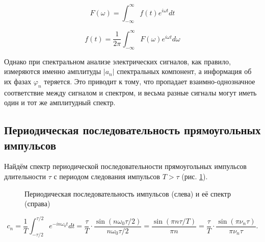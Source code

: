\documentclass[a4paper, 12pt]{article}
\begin{document}
    \begin{equation}
        F(\omega) = \int_{-\infty}^{\infty} f(t) e^{i \omega t} dt
        \label{eq:dir_fourier}
    \end{equation}

    \begin{equation}
        f(t) = \frac{1}{2\pi} \int_{-\infty}^{\infty} F(\omega) e^{i \omega t} d\omega
        \label{eq:inv_fourier}
    \end{equation}

    Однако при спектральном анализе электрических сигналов, как правило, измеряются именно амплитуды $\lvert a_n \rvert$ спектральных компонент, а информация об их фазах $\varphi_n$ теряется. Это приводит к тому, что пропадает взаимно-однозначное соответствие между сигналом и спектром, и весьма разные сигналы могут иметь один и тот же амплитудный спектр.

    \subsection{Периодическая последовательность прямоугольных импульсов}

    Найдём спектр периодической последовательности прямоугольных импульсов длительности $\tau$ с периодом следования импульсов $T > \tau$ (рис. \ref{impulse}).

    \begin{figure}[H]
        \centering
        \caption{Периодическая последовательность импульсов (слева) и её спектр (справа)}
        \label{impulse}
    \end{figure}

    \begin{equation}
        c_n = \frac{1}{T} \int_{-\tau/2}^{\tau/2} e^{-in \omega_0 t} dt = \frac{\tau}{T} \cdot \frac{\sin{(n\omega_0 \tau/2)}}{n\omega_0 \tau/2} = \frac{\sin{(\pi n \tau / T)}}{\pi n} = \frac{\tau}{T} \cdot \frac{\sin{(\pi \nu_n \tau)}}{\pi \nu_n \tau}.
        \label{eq:impulse}
    \end{equation}
\end{document}
